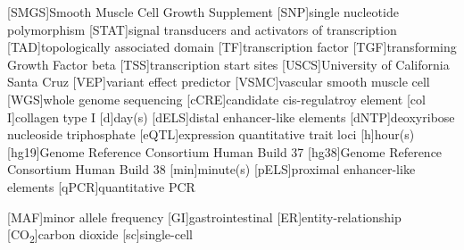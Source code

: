 \begin{acronym}
[SMGS]{Smooth Muscle Cell Growth Supplement}
[SNP]{single nucleotide polymorphism}
[STAT]{signal transducers and activators of transcription}
[TAD]{topologically associated domain}
[TF]{transcription factor}
[TGF\beta]{transforming Growth Factor beta}
[TSS]{transcription start sites}
[USCS]{University of California Santa Cruz}
[VEP]{variant effect predictor}
[VSMC]{vascular smooth muscle cell}
[WGS]{whole genome sequencing}
[cCRE]{candidate cis-regulatroy element}
[col I]{collagen type I}
[d]{day(s)}
[dELS]{distal enhancer-like elements}
[dNTP]{deoxyribose nucleoside triphosphate}
[eQTL]{expression quantitative trait loci}
[h]{hour(s)}
[hg19]{Genome Reference Consortium Human Build 37}
[hg38]{Genome Reference Consortium Human Build 38}
[min]{minute(s)}
[pELS]{proximal enhancer-like elements}
[qPCR]{quantitative PCR}

[MAF]{minor allele frequency}
[GI]{gastrointestinal}
[ER]{entity-relationship}
[CO\textsubscript{2}]{carbon dioxide}
[sc]{single-cell}
\end{acronym}
